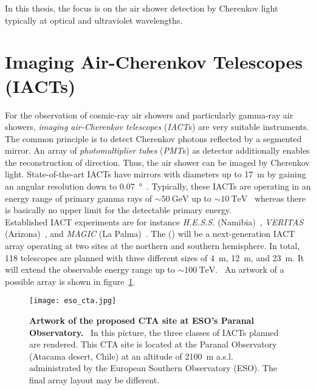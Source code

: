 In this thesis, the focus is on the air shower detection by Cherenkov light typically at optical and ultraviolet wavelengths.

\section{Imaging Air-Cherenkov Telescopes (IACTs)}

For the observation of cosmic-ray air showers and particularly gamma-ray air showers, \textit{imaging air-Cherenkov telescopes} (\textit{IACT}s) are very suitable instruments. The common principle is to detect Cherenkov photons reflected by a segmented mirror. An array of \textit{photomultiplier tubes} (\textit{PMT}s) as detector additionally enables the reconstruction of direction. Thus, the air shower can be imaged by Cherenkov light. State-of-the-art IACTs have mirrors with diameters up to \SI{17}{\meter} by gaining an angular resolution down to \SI{0.07}{\degree}~\cite{iacts:magic}. Typically, these IACTs are operating in an energy range of primary gamma rays of $\sim\SI{50}{\giga\electronvolt}$ up to $\sim\SI{10}{\tera\electronvolt}$~\cite{iacts:magic} whereas there is basically no upper limit for the detectable primary energy.\\

Established IACT experiments are for instance \textit{H.E.S.S.} (Namibia)~\cite{iacts:hess}, \textit{VERITAS} (Arizona)~\cite{iacts:veritas}, and \textit{MAGIC} (La Palma)~\cite{iacts:magic}. The  () will be a next-generation IACT array operating at two sites at the northern and southern hemisphere. In total, \num{118} telescopes are planned with three different sizes of \SI{4}{\meter}, \SI{12}{\meter}, and \SI{23}{\meter}. It will extend the observable energy range up to $\sim\SI{100}{\tera\electronvolt}$.~\cite{iacts:cta} An artwork of a possible array is shown in figure~\ref{cta_artwork}.\\

\begin{figure}[H]
	\centering
	\texttt{[image: eso\_cta.jpg]}
	\caption[Artwork of the proposed CTA site at ESO's Paranal Observatory]{\textbf{Artwork of the proposed CTA site at ESO's Paranal Observatory.}~\cite{iacts:cta_artwork} In this picture, the three classes of IACTs planned are rendered. This CTA site is located at the Paranal Observatory (Atacama desert, Chile) at an altitude of \SI{2100}{\meter} a.s.l. administrated by the European Southern Observatory (ESO). The final array layout may be different.~\cite{iacts:cta}}
	\label{cta_artwork}
\end{figure}

